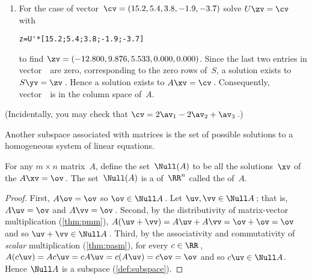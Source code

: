 \begin{example}
\begin{solution}
\begin{enumerate}
\item For the case of vector~\(\cv=(15.2,5.4,3.8,-1.9,-3.7)\) solve \(U\zv=\cv\) with 
\begin{verbatim}
z=U'*[15.2;5.4;3.8;-1.9;-3.7]
\end{verbatim}
to find \(\zv=(-12.800,9.876,5.533,0.000,0.000)\).
Since the last two entries in vector~\zv\ are zero, corresponding to the zero rows of~\(S\), a solution exists to \(S\yv=\zv\)\,.
Hence a solution exists to \(A\xv=\cv\)\,.
Consequently, vector~\cv\ is in the column space of~\(A\).

\end{enumerate}
(Incidentally, you may check that \(\cv=2\av_1-2\av_2+\av_3\)\,.)
\end{solution}
\end{example}






Another subspace associated with matrices is the set of possible solutions to a homogeneous system of linear equations.


\begin{theorem}\label{thm:homosubsp} 
For any $m\times n$ matrix~$A$, define the set~$\Null(A)$ to be all the solutions~$\xv$ of the   $A\xv=\ov$\,. 
The set~\(\Null(A)\) is a  of~$\RR^n$ called the  of~$A$.
\end{theorem}
\begin{proof} 
First, \(A\ov=\ov\) so \(\ov\in\Null A\)\,.
Let \(\uv,\vv\in\Null A\)\,; that is, \(A\uv=\ov\) and \(A\vv=\ov\)\,.
Second, by the distributivity of matrix-vector multiplication (\cref{thm:pmm}), \(A(\uv+\vv)=A\uv+A\vv=\ov+\ov=\ov\) and so \(\uv+\vv\in\Null A\)\,.
Third, by the associativity and commutativity of \emph{scalar} multiplication (\cref{thm:pasm}), for every \(c\in\RR\)\,, \(A(c\uv)=Ac\uv=cA\uv=c(A\uv)=c\ov=\ov\) and so \(c\uv\in\Null A\). 
Hence \(\Null A\) is a subspace (\cref{def:subspace}).
\end{proof}





